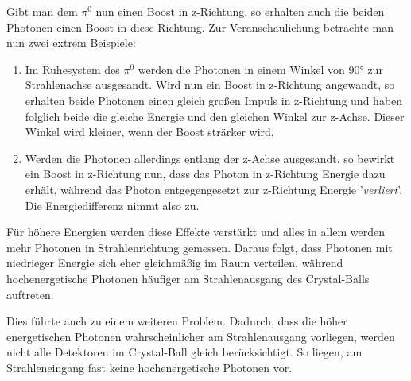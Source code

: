 \documentclass[a4paper,11pt,oneside,final,german,openbib,pdftex]{scrbook}
\begin{document}
{Gibt man dem $\pi^0$ nun einen Boost in z-Richtung, so erhalten auch die beiden Photonen einen Boost in diese Richtung.
Zur Veranschaulichung betrachte man nun zwei extrem Beispiele:

\begin{enumerate}
	\item Im Ruhesystem des $\pi^0$ werden die Photonen in einem Winkel von 90° zur Strahlenachse ausgesandt. Wird nun ein Boost in z-Richtung angewandt, so erhalten beide Photonen einen gleich gro{\ss}en Impuls in z-Richtung und haben folglich beide die gleiche Energie und den gleichen Winkel zur z-Achse. Dieser Winkel wird kleiner, wenn der Boost str\"arker wird.
	\item Werden die Photonen allerdings entlang der z-Achse ausgesandt, so bewirkt ein Boost in z-Richtung nun, dass das Photon in z-Richtung Energie dazu erh\"alt, w\"ahrend das Photon entgegengesetzt zur z-Richtung Energie '\textit{verliert}'. Die Energiedifferenz nimmt also zu.
\end{enumerate}

F\"ur h\"ohere Energien werden diese Effekte verst\"arkt und alles in allem werden mehr Photonen in Strahlenrichtung gemessen. Daraus folgt, dass Photonen mit niedrieger Energie sich eher gleichm\"a{\ss}ig im Raum verteilen, w\"ahrend hochenergetische Photonen h\"aufiger am Strahlenausgang des Crystal-Balls auftreten.

Dies f\"uhrte auch zu einem weiteren Problem. Dadurch, dass die h\"oher energetischen Photonen wahrscheinlicher am Strahlenausgang vorliegen, werden nicht alle Detektoren im Crystal-Ball gleich ber\"ucksichtigt. So liegen, am Strahleneingang fast keine hochenergetische Photonen vor.


}
\end{document}
